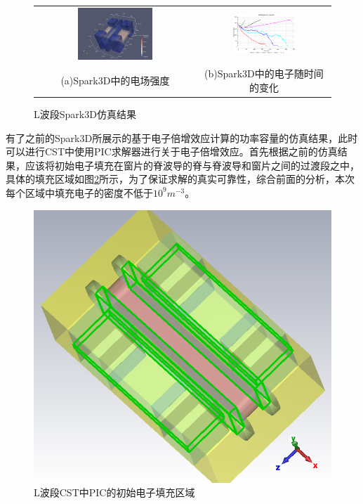 \documentclass[master]{thesis-uestc}
\begin{document}
\begin{figure}[!htb]
    \small
    \centering
    \begin{tabular}{@{\ }c@{\ }c}
        \includegraphics[width=0.49\textwidth]{pic/chapter4/L波段Spark3D电场.png} & 
        \hspace{5pt}
        \includegraphics[width=0.49\textwidth]{pic/chapter4/Spark3D中的电子随时间的变化.png}     \\
        \mbox{\small (a)Spark3D中的电场强度}                                                                               & 
        \mbox{\small (b)Spark3D中的电子随时间的变化}                                                                                  \\
    \end{tabular}
    \caption{L波段Spark3D仿真结果}
    \label{fig:L波段Spark3D仿真结果}
\end{figure}

有了之前的Spark3D所展示的基于电子倍增效应计算的功率容量的仿真结果，此时可以进行CST中使用PIC求解器进行关于电子倍增效应。首先根据之前的仿真结果，应该将初始电子填充在窗片的脊波导的脊与脊波导和窗片之间的过渡段之中，具体的填充区域如图\ref{fig:L波段CST电子填充方法}所示，为了保证求解的真实可靠性，综合前面的分析，本次每个区域中填充电子的密度不低于$10^9 m^{-3}$。
\begin{figure}[!htb]
    \centering
    \includegraphics[width=0.25\linewidth]{pic/chapter4/L波段CST电子填充方法.png}
    \caption{L波段CST中PIC的初始电子填充区域}
    \label{fig:L波段CST电子填充方法}
\end{figure}
\end{document}
